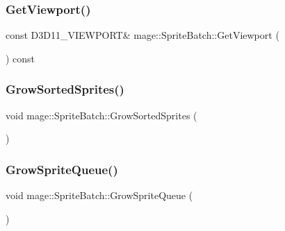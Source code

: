\subsubsection{\texorpdfstring{Get\+Viewport()}{GetViewport()}}
{\footnotesize\ttfamily const D3\+D11\+\_\+\+V\+I\+E\+W\+P\+O\+RT\& mage\+::\+Sprite\+Batch\+::\+Get\+Viewport (\begin{DoxyParamCaption}{ }\end{DoxyParamCaption}) const}

\hypertarget{classmage_1_1_sprite_batch_ae403aa1afdd7df1f67bfd98ced8e76a4}{}\label{classmage_1_1_sprite_batch_ae403aa1afdd7df1f67bfd98ced8e76a4} 
\subsubsection{\texorpdfstring{Grow\+Sorted\+Sprites()}{GrowSortedSprites()}}
{\footnotesize\ttfamily void mage\+::\+Sprite\+Batch\+::\+Grow\+Sorted\+Sprites (\begin{DoxyParamCaption}{ }\end{DoxyParamCaption})\hspace{0.3cm}{\ttfamily [private]}}

\hypertarget{classmage_1_1_sprite_batch_a7e12144793e4a69c2f9eb7aea9326049}{}\label{classmage_1_1_sprite_batch_a7e12144793e4a69c2f9eb7aea9326049} 
\subsubsection{\texorpdfstring{Grow\+Sprite\+Queue()}{GrowSpriteQueue()}}
{\footnotesize\ttfamily void mage\+::\+Sprite\+Batch\+::\+Grow\+Sprite\+Queue (\begin{DoxyParamCaption}{ }\end{DoxyParamCaption})\hspace{0.3cm}{\ttfamily [private]}}

\hypertarget{classmage_1_1_sprite_batch_aa2a5df588d7589a36b38b35dc8a08a48}{}\label{classmage_1_1_sprite_batch_aa2a5df588d7589a36b38b35dc8a08a48} 
